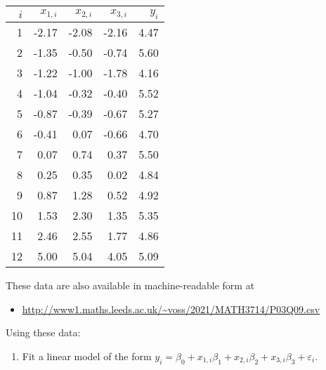 \documentclass[
  a4paper,
]{article}
\providecommand{\tightlist}{%
  \setlength{\itemsep}{0pt}\setlength{\parskip}{0pt}}
\theoremstyle{definition}
\theoremstyle{definition}
\theoremstyle{definition}
\theoremstyle{definition}
\theoremstyle{remark}
\begin{document}
\begin{longtable}[]{@{}rrrrr@{}}
\toprule()
\(i\) & \(x_{1,i}\) & \(x_{2,i}\) & \(x_{3,i}\) & \(y_i\) \\
\midrule()
\endhead
1 & -2.17 & -2.08 & -2.16 & 4.47 \\
2 & -1.35 & -0.50 & -0.74 & 5.60 \\
3 & -1.22 & -1.00 & -1.78 & 4.16 \\
4 & -1.04 & -0.32 & -0.40 & 5.52 \\
5 & -0.87 & -0.39 & -0.67 & 5.27 \\
6 & -0.41 & 0.07 & -0.66 & 4.70 \\
7 & 0.07 & 0.74 & 0.37 & 5.50 \\
8 & 0.25 & 0.35 & 0.02 & 4.84 \\
9 & 0.87 & 1.28 & 0.52 & 4.92 \\
10 & 1.53 & 2.30 & 1.35 & 5.35 \\
11 & 2.46 & 2.55 & 1.77 & 4.86 \\
12 & 5.00 & 5.04 & 4.05 & 5.09 \\
\bottomrule()
\end{longtable}

These data are also available in machine-readable form at

\begin{itemize}
\tightlist
\item
  \url{http://www1.maths.leeds.ac.uk/~voss/2021/MATH3714/P03Q09.csv}
\end{itemize}

Using these data:

\begin{enumerate}
\def\labelenumi{\alph{enumi}.}
\tightlist
\item
  Fit a linear model of the form
  \(y_i = \beta_0 + x_{1,i} \beta_1 + x_{2,i} \beta_2 + x_{3,i} \beta_3 + \varepsilon_i\).
\end{enumerate}
\end{document}
